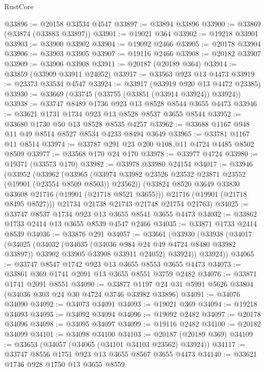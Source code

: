 \begin{lexlean}{RustCore}
\begin{coremodule}
@33896 := @20158 @33534 @4547
@33897 := @33894 @33896
@33900 := @33869 (@33874 (@33883 @33897))
@33901 := @19021 @364
@33902 := @19218 @33901
@33903 := @33900 @33902
@33904 := @19092 @2466
@33905 := @20178 @33904
@33906 := @33903 @33905
@33907 := @19116 @2466
@33908 := @20182 @33907
@33909 := @33906 @33908
@33911 := @20187 (@20189 @364)
@33914 := @33859 (@33909 @33911 @24052)
@33917 := @33563 @923 @13 @4473
@33919 := @23373 @33534 @4547
@33924 := @33917 (@33919 @920 @13 @4472 @23385)
@33930 := @33669 (@33745 (@33755 (@33851 (@33914 @33924)) @33924))
@33938 := @33747 @8489 @1736 @923 @13 @8528 @8544 @3655 @4473
@33946 := @33621 @1731 @1734 @923 @13 @8528 @8537 @3655 @8544
@33952 := @33680 @1730 @50 @13 @8528 @8535 @4257
@33962 := @33688 @1167 @948 @11 @49 @8514 @8527 @8534 @4233 @8494 @3649
@33965 := @33781 @1167 @11 @8514
@33974 := @33787 @291 @23 @200 @108 @11 @4724 @4485 @8502 @8509
@33977 := @33568 @170 @24 @170
@33978 := @33977 @4724
@33980 := @19371 (@33573 @170)
@33982 := @33978 @33980 @24154
@34017 := @33946
    (@33952
      (@33962
        (@33965 (@33974 @33982 @23526 @23532 @23871 @23552 (@19901 (@23554 @8509 @8503)) @23562))
        (@33824 @8520 @3649 @33830 @33608 @21716 (@19901 (@21718 @8521 @3655)))
        @21716
        (@19901 (@21718 @8495 @8527)))
      @21734
      @21738
      @21743
      @21748
      @21754
      @21763)
@34025 := @33747 @8537 @1734 @923 @13 @3655 @8541 @3655 @4473
@34032 := @33862 @1733 @2414 @13 @3655 @8539 @4547 @2466
@34035 := @33871 @1733 @2414 @8539
@34036 := @33876 @291
@34057 := @33661
    (@33930
      (@33938
        (@34017
          (@34025
            (@34032
              (@34035 (@34036 @984 @24 @49 @4724 @8480 @33982 @33897))
              @33902
              @33905
              @33908
              @33911
              @24052)
            @33924))
        @33924))
@34065 := @33747 @8547 @1742 @923 @13 @3655 @8553 @3655 @4473
@34073 := @33861 @369 @1741 @2091 @13 @3655 @8551 @3759 @2482
@34076 := @33871 @1741 @2091 @8551
@34090 := @33877 @1197 @24 @31 @5991 @5626 @33804 (@34036 @303 @24 @30 @4724 @3746 @33982 @33896)
@34091 := @34076 @34090
@34092 := @34073 @34091
@34093 := @19021 @369
@34094 := @19218 @34093
@34095 := @34092 @34094
@34096 := @19092 @2482
@34097 := @20178 @34096
@34098 := @34095 @34097
@34099 := @19116 @2482
@34100 := @20182 @34099
@34101 := @34098 @34100
@34103 := @20187 (@20189 @369)
@34109 := @33653 (@34057 (@34065 (@34101 @34103 @23562) @33924))
@34117 := @33747 @8556 @1751 @923 @13 @3655 @8567 @3655 @4473
@34140 := @33621
    @1746
    @928
    @1750
    @13
    @3655
    @8559

\end{coremodule}
\end{lexlean}
